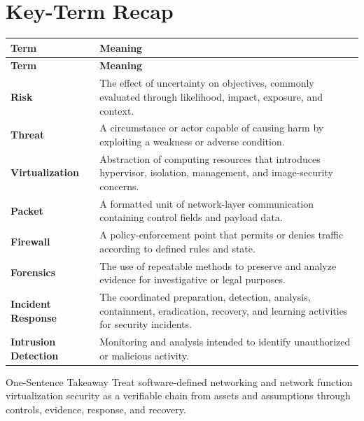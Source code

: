 \documentclass[11pt,letterpaper]{article}
\begin{document}
\section*{Key-Term Recap}
\begin{longtable}{>{\raggedright\arraybackslash}p{}>{\raggedright\arraybackslash}p{}}
\toprule\rowcolor{Navy}\color{white}\textbf{Term} & \color{white}\textbf{Meaning}\\\midrule
\endfirsthead
\toprule\rowcolor{Navy}\color{white}\textbf{Term} & \color{white}\textbf{Meaning}\\\midrule
\endhead
\textbf{Risk} & The effect of uncertainty on objectives, commonly evaluated through likelihood, impact, exposure, and context. \\\midrule
\textbf{Threat} & A circumstance or actor capable of causing harm by exploiting a weakness or adverse condition. \\\midrule
\textbf{Virtualization} & Abstraction of computing resources that introduces hypervisor, isolation, management, and image-security concerns. \\\midrule
\textbf{Packet} & A formatted unit of network-layer communication containing control fields and payload data. \\\midrule
\textbf{Firewall} & A policy-enforcement point that permits or denies traffic according to defined rules and state. \\\midrule
\textbf{Forensics} & The use of repeatable methods to preserve and analyze evidence for investigative or legal purposes. \\\midrule
\textbf{Incident Response} & The coordinated preparation, detection, analysis, containment, eradication, recovery, and learning activities for security incidents. \\\midrule
\textbf{Intrusion Detection} & Monitoring and analysis intended to identify unauthorized or malicious activity. \\\midrule
\bottomrule
\end{longtable}
\begin{CornellExamBox}{One-Sentence Takeaway}
Treat software-defined networking and network function virtualization security as a verifiable chain from assets and assumptions through controls, evidence, response, and recovery.
\end{CornellExamBox}
\end{document}
